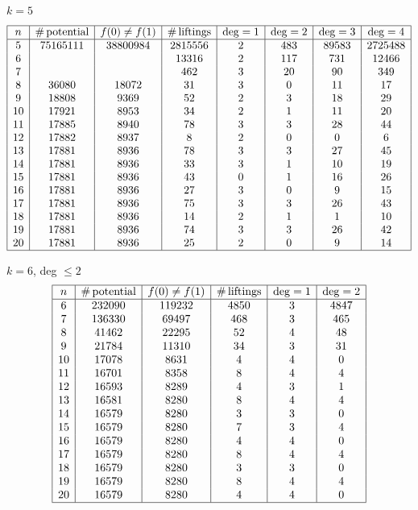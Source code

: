 \documentclass[11pt,english,a4paper]{amsart}
\theoremstyle{plain}
\theoremstyle{definition}
\theoremstyle{remark}
\begin{document}
    $k=5$
	\[
	\begin{array}{|c|c|c|c|c|c|c|c|} \hline
		n & \#\,\text{potential} & f(0) \neq f(1) & \#\,\text{liftings} & \deg = 1 & \deg = 2 & \deg = 3 & \deg = 4 \\ \hline
		5 & 75165111 & 38800984 & 2815556 & 2 & 483 & 89583 & 2725488 \\
		6 & & & 13316 & 2 & 117 & 731 & 12466 \\
		7 & & & 462 & 3 & 20 & 90 & 349 \\
		8 & 36080 & 18072 & 31 & 3 & 0 & 11 & 17 \\
		9 & 18808 & 9369 & 52 & 2 & 3 & 18 & 29 \\
		10 & 17921 & 8953 & 34 & 2 & 1 & 11 & 20 \\
		11 & 17885 & 8940 & 78 & 3 & 3 & 28 & 44 \\
		12 & 17882 & 8937 & 8 & 2 & 0 & 0 & 6 \\
		13 & 17881 & 8936 & 78 & 3 & 3 & 27 & 45 \\
		14 & 17881 & 8936 & 33 & 3 & 1 & 10 & 19 \\
		15 & 17881 & 8936 & 43 & 0 & 1 & 16 & 26 \\
		16 & 17881 & 8936 & 27 & 3 & 0 & 9 & 15 \\
		17 & 17881 & 8936 & 75 & 3 & 3 & 26 & 43 \\
		18 & 17881 & 8936 & 14 & 2 & 1 & 1 & 10 \\
		19 & 17881 & 8936 & 74 & 3 & 3 & 26 & 42 \\
		20 & 17881 & 8936 & 25 & 2 & 0 & 9 & 14 \\ \hline
	\end{array}
	\]

    $k=6$, deg $\leq 2$
	\[
	\begin{array}{|c|c|c|c|c|c|} \hline
		n & \#\,\text{potential} & f(0) \neq f(1) & \#\,\text{liftings} & \deg = 1 & \deg = 2 \\ \hline
		6 & 232090 & 119232 & 4850 & 3 & 4847 \\
		7 & 136330 & 69497 & 468 & 3 & 465 \\
		8 & 41462 & 22295 & 52 & 4 & 48 \\
		9 & 21784 & 11310 & 34 & 3 & 31 \\
		10 & 17078 & 8631 & 4 & 4 & 0 \\
		11 & 16701 & 8358 & 8 & 4 & 4 \\
		12 & 16593 & 8289 & 4 & 3 & 1 \\
		13 & 16581 & 8280 & 8 & 4 & 4 \\
		14 & 16579 & 8280 & 3 & 3 & 0 \\
		15 & 16579 & 8280 & 7 & 3 & 4 \\
		16 & 16579 & 8280 & 4 & 4 & 0 \\
		17 & 16579 & 8280 & 8 & 4 & 4 \\
		18 & 16579 & 8280 & 3 & 3 & 0 \\
        19 & 16579 & 8280 & 8 & 4 & 4 \\
        20 & 16579 & 8280 & 4 & 4 & 0 \\ \hline
	\end{array}
	\]
\end{document}
